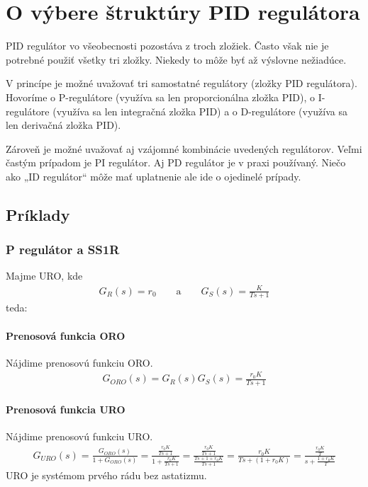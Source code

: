 \documentclass[a4paper, 10pt, ]{article}
\begin{document}
\section{O výbere štruktúry PID regulátora}

PID regulátor vo všeobecnosti pozostáva z troch zložiek. Často však nie je potrebné použiť všetky tri zložky. Niekedy to môže byť až výslovne nežiadúce.

V princípe je možné uvažovať tri samostatné regulátory (zložky PID regulátora). Hovoríme o P-regulátore (využíva sa len proporcionálna zložka PID), o I-regulátore (využíva sa len integračná zložka PID) a o D-regulátore (využíva sa len derivačná zložka PID).

Zároveň je možné uvažovať aj vzájomné kombinácie uvedených regulátorov. Veľmi častým prípadom je PI regulátor. Aj PD regulátor je v praxi používaný. Niečo ako „ID regulátor“ môže mať uplatnenie ale ide o ojedinelé prípady.



\subsection{Príklady}


\subsubsection{P regulátor a SS1R}

Majme URO, kde
\begin{align}
    G_R(s) = r_0 \qquad \text{a} \qquad  G_S(s) = \frac{K}{Ts+1}
\end{align}
teda:

\begin{center}

    \makebox[\textwidth][c]{%
    
    }

	\figcaption{}
	\label{URO_P_SS1R}

\end{center}



\paragraph{Prenosová funkcia ORO}
Nájdime prenosovú funkciu ORO.
\begin{align}
    G_{ORO}(s) = G_R(s) G_S(s) = \frac{r_0 K}{Ts+1}
\end{align}


\paragraph{Prenosová funkcia URO}
Nájdime prenosovú funkciu URO.
\begin{align}
    G_{URO}(s)
    =  \frac{G_{ORO}(s)}{1+G_{ORO}(s)}
    = \frac{\frac{r_0 K}{Ts+1}}{1+\frac{r_0 K}{Ts+1}}
    = \frac{\frac{r_0 K}{Ts+1}}{\frac{Ts+1 + r_0 K}{Ts+1}}
    = \frac{r_0 K}{Ts+ (1 + r_0 K)}
    = \frac{ \frac{r_0 K}{T}}{s+ \frac{1 + r_0 K}{T}}
\end{align}
URO je systémom prvého rádu bez astatizmu.
\end{document}

